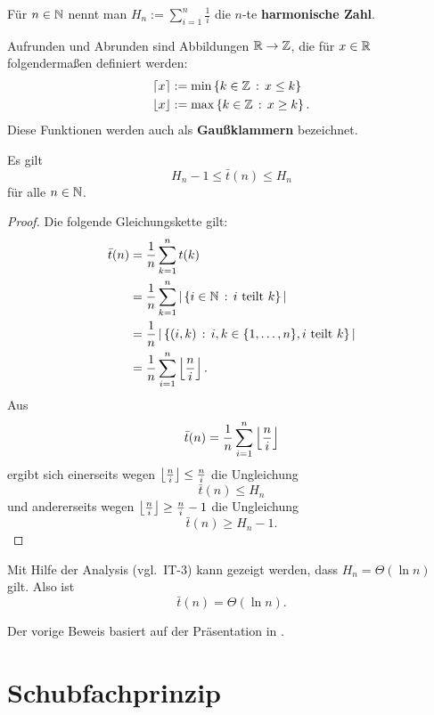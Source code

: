 \begin{defn}
	Für $n \in \mathbb{N}$ nennt man $H_n := \sum\limits_{i=1}^n \frac{1}{i}$ die $n$-te \textbf{harmonische Zahl}. 
\end{defn} 

\begin{defn}
	Aufrunden und Abrunden sind Abbildungen $\mathbb{R} \to \mathbb{Z}$, die für $x \in \mathbb{R}$ folgendermaßen definiert werden: 
	\begin{align*}
			\left\lceil x \right\rceil & := \min \left\{ k \in \mathbb{Z} \,:\, x \le k \right\}
			\\ \left\lfloor x \right\rfloor & := \max \left\{ k \in \mathbb{Z} \,:\, x \ge k \right\}. 
	\end{align*}
	Diese Funktionen werden auch als \textbf{Gau\ss klammern} bezeichnet.
\end{defn} 


\begin{thm}
	Es gilt
	\[
		 H_n - 1 \le \bar{t}(n) \le H_n 
	\]
	für alle $n \in \mathbb{N}$. 
\end{thm} 
\begin{proof}
	Die folgende Gleichungskette gilt:
	\begin{align*} 
		\bar{t} (n) & = \frac{1}{n} \sum_{k=1}^n t(k) 
		\\ & = \frac{1}{n} \sum_{k=1}^n | \setcond{i \in \N}{i \ \text{teilt} \ k}|
		\\ & = \frac{1}{n} \, | \setcond{(i,k)}{i,k \in \{1,\ldots,n\}, i \ \text{teilt}  \ k}|
		\\ & = \frac{1}{n} \sum_{i=1}^n \floor{ \frac{n}{i}}. 
	\end{align*}  
	Aus 
	\[
			\bar{t} (n) = \frac{1}{n} \sum_{i=1}^n \left\lfloor  \frac{n}{i} \right\rfloor
	\]
	ergibt sich einerseits wegen $\left\lfloor  \frac{n}{i} \right\rfloor \le \frac{n}{i}$ die Ungleichung 
	\[
			\bar{t}(n) \le H_n
	\]
	und andererseits wegen $\left\lfloor  \frac{n}{i}  \right\rfloor \ge \frac{n}{i} - 1$ die Ungleichung 
	\[
			\bar{t}(n) \ge H_n -1. 
	\]
\end{proof} 

\begin{bem}
	Mit Hilfe der Analysis (vgl.~IT-3) kann gezeigt werden, dass $H_n= \Theta(\ln n)$ gilt. Also ist 
	\[
		\bar{t}(n) = \Theta(\ln n). 
	\]
\end{bem} 

\begin{bem}
	Der vorige Beweis basiert auf der Präsentation in \cite[Kap.~25, Abs.~4]{AZ02}. 
\end{bem} 

\section{Schubfachprinzip} 


